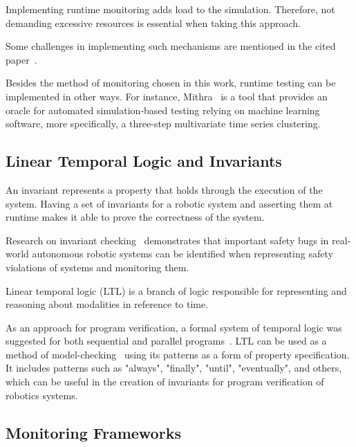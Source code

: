 Implementing runtime monitoring adds load to the simulation. Therefore, not demanding excessive resources is essential when taking this approach.

Some challenges in implementing such mechanisms are mentioned in the cited paper~\cite{stadler2022towards}.

Besides the method of monitoring chosen in this work, runtime testing can be implemented in other ways. For instance, Mithra~\cite{AfzalMithra} is a tool that provides an oracle for automated simulation-based testing relying on machine learning software, more specifically, a three-step multivariate time series clustering.


\subsection{Linear Temporal Logic and Invariants}
\label{ssec:ltlinvariants}

An invariant represents a property that holds through the execution of the system. Having a set of invariants for a robotic system and asserting them at runtime makes it able to prove the correctness of the system.

Research on invariant checking~\cite{zizyte2021importance} demonstrates that important safety bugs in real-world autonomous robotic systems can be identified when representing safety violations of systems and monitoring them.

Linear temporal logic (LTL) is a branch of logic responsible for representing and reasoning about modalities in reference to time. 

As an approach for program verification, a formal system of temporal logic was suggested for both sequential and parallel programs~\cite{pnueli1977temporal}. LTL can be used as a method of model-checking~\cite{dwyer1998property} using its patterns as a form of property specification. It includes patterns such as "always", "finally", "until", "eventually", and others, which can be useful in the creation of invariants for program verification of robotics systems.


\subsection{Monitoring Frameworks}
\label{ssec:monitoringframeworks}

